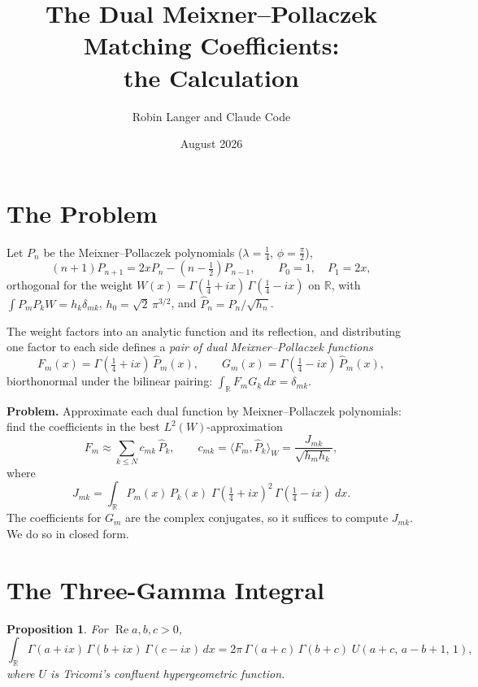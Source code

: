 \documentclass[11pt,a4paper]{article}
\title{\textbf{The Dual Meixner--Pollaczek Matching Coefficients:\\
the Calculation}}
\author{Robin Langer and Claude Code}
\date{August 2026}
\newtheorem{proposition}{Proposition}[section]
\newcommand{\R}{\mathbb{R}}
\begin{document}
\maketitle

\section{The Problem}

Let $P_n$ be the Meixner--Pollaczek polynomials
($\lambda = \tfrac14$, $\phi = \tfrac{\pi}{2}$),
\[
  (n+1) P_{n+1} = 2x P_n - (n - \tfrac12) P_{n-1},
  \qquad P_0 = 1, \quad P_1 = 2x,
\]
orthogonal for the weight
$W(x) = \Gamma(\tfrac14+ix)\,\Gamma(\tfrac14-ix)$ on $\R$, with
$\int P_m P_k W = h_k \delta_{mk}$, $h_0 = \sqrt2\,\pi^{3/2}$, and
$\widehat{P}_n = P_n/\sqrt{h_n}$.

The weight factors into an analytic function and its reflection, and
distributing one factor to each side defines a \emph{pair of dual
Meixner--Pollaczek functions}
\[
  F_m(x) = \Gamma(\tfrac14+ix)\, \widehat{P}_m(x),
  \qquad
  G_m(x) = \Gamma(\tfrac14-ix)\, \widehat{P}_m(x),
\]
biorthonormal under the bilinear pairing:
$\int_\R F_m G_k\, dx = \delta_{mk}$.

\textbf{Problem.} Approximate each dual function by
Meixner--Pollaczek polynomials: find the coefficients in the best
$L^2(W)$-approximation
\[
  F_m \approx \sum_{k \le N} c_{mk}\, \widehat{P}_k,
  \qquad
  c_{mk} = \langle F_m, \widehat{P}_k \rangle_W
  = \frac{J_{mk}}{\sqrt{h_m h_k}},
\]
where
\begin{equation}\label{eq:J}
  J_{mk} = \int_\R P_m(x)\, P_k(x)\;
  \Gamma(\tfrac14+ix)^2\, \Gamma(\tfrac14-ix)\; dx.
\end{equation}
The coefficients for $G_m$ are the complex conjugates, so it suffices
to compute $J_{mk}$. We do so in closed form.

\section{The Three-Gamma Integral}

\begin{proposition}\label{prop:3gamma}
For $\operatorname{Re} a, b, c > 0$,
\[
  \int_\R \Gamma(a+ix)\,\Gamma(b+ix)\,\Gamma(c-ix)\, dx
  = 2\pi\, \Gamma(a+c)\,\Gamma(b+c)\; U(a+c,\, a-b+1,\, 1),
\]
where $U$ is Tricomi's confluent hypergeometric function.
\end{proposition}
\end{document}
